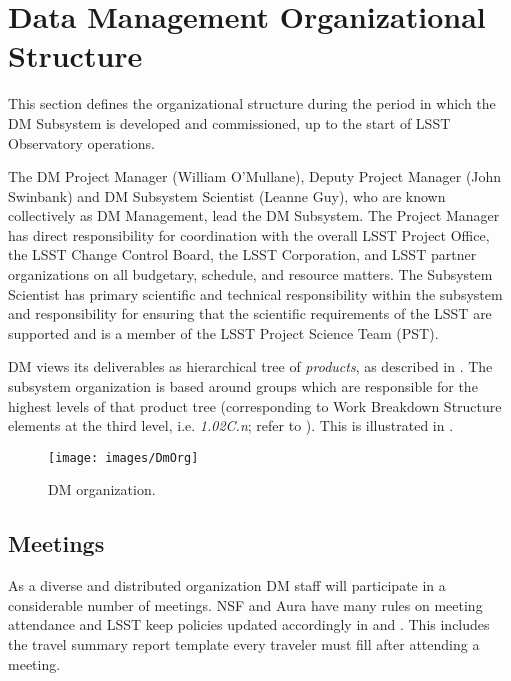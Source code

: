 \section{Data Management Organizational Structure}

This section defines the organizational structure during the period in which the DM Subsystem is developed and commissioned, up to the start of LSST Observatory operations.

The DM Project Manager (William O'Mullane), Deputy Project Manager (John Swinbank) and DM Subsystem Scientist (Leanne Guy), who are known collectively as DM Management, lead the DM Subsystem.
The Project Manager has direct responsibility for coordination with the overall LSST Project Office, the LSST Change Control Board, the LSST Corporation, and LSST partner organizations on all budgetary, schedule, and resource matters.
The Subsystem Scientist has primary scientific and technical responsibility within the subsystem and responsibility for ensuring that the scientific requirements of the LSST are supported and is a member of the LSST Project Science Team (PST).

DM views its deliverables as hierarchical tree of \textit{products}, as described in .
The subsystem organization is based around groups which are responsible for the highest levels of that product tree (corresponding to Work Breakdown Structure elements at the third level, i.e. \textit{1.02C.n}; refer to ).
This is illustrated in .

\begin{figure}[htbp]
\begin{center}
 \texttt{[image: images/DmOrg]}
\caption{DM organization. \label{fig:dmorg}}
\end{center}
\end{figure}

\subsection {Meetings} \label{sect:meetings}

As a diverse and distributed organization DM staff will participate in a considerable number of meetings.
NSF and Aura have many rules on meeting attendance and LSST keep policies updated accordingly in  and . This includes the travel summary report template  every traveler must fill after attending a meeting.

